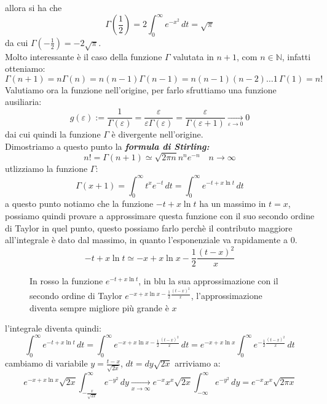 allora  si ha che
\[\Gamma\left(\frac{1}{2}\right) = 2\int_0^\infty e^{-x^2}\,dt = \sqrt{\pi}\]
da cui $\Gamma(-\frac{1}{2}) = -2\sqrt{\pi}$.\\
Molto interessante è il caso della funzione $\Gamma$ valutata in $n+1$, com $n\in\mathbb{N}$, infatti otteniamo:
\[\Gamma(n+1) = n\Gamma(n) = n(n-1)\Gamma(n-1) =n(n-1)(n-2)\dots1\,\Gamma(1) = n! \]
Valutiamo ora la funzione nell'origine, per farlo sfruttiamo una funzione ausiliaria:
\[g(\varepsilon) := \frac{1}{\Gamma(\varepsilon)} = \frac{\varepsilon}{\varepsilon\Gamma(\varepsilon)} =\frac{\varepsilon}{\Gamma(\varepsilon+1)} \xrightarrow[\varepsilon\to 0]{} 0\]
dai cui quindi la funzione $\Gamma$ è divergente nell'origine.\\
\newline Dimostriamo a questo punto la \emph{\textbf{formula di Stirling:}}
\[n! = \Gamma(n+1) \simeq \sqrt{2\pi n}n^n e^{-n}\quad n\to \infty \]
utlizziamo la funzione $\Gamma$:
\[\Gamma(x+1) = \int_0^\infty t^{x}e^{-t}\,dt = \int_0^\infty e^{-t+x\ln t}\,dt\]
a questo punto notiamo che la funzione $-t+x\ln t $ ha un massimo in $t=x$, possiamo quindi provare a approssimare questa funzione con il suo secondo ordine di Taylor in quel punto, questo possiamo farlo perchè il contributo maggiore all'integrale è dato dal massimo, in quanto l'esponenziale va rapidamente a 0.
\[-t+x\ln t \simeq -x + x\ln x - \frac{1}{2}\frac{(t-x)^2}{x}\]
\begin{figure}[H]
\centering
{}
\caption{In rosso la funzione $e^{-t+x\ln t}$, in blu la sua approssimazione con il secondo ordine di Taylor $e^{-x+x\ln x -\frac{1}{2}\frac{(t-x)^2}{x}}$, l'approssimazione diventa sempre migliore più grande è $x$}
\end{figure}
l'integrale diventa quindi:
\[\int_0^\infty e^{-t+x\ln t}\,dt = \int_0^\infty e^{-x+x\ln x -\frac{1}{2}\frac{(t-x)^2}{x}}\,dt = e^{-x+x\ln x}\int_0^\infty e^{-\frac{1}{2}\frac{(t-x)^2}{x}}\,dt \]
cambiamo di variabile $y = \frac{t-x}{\sqrt{2x}}$, $dt = dy\sqrt{2x}$ arriviamo a:
\[e^{-x+x\ln x}\sqrt{2x}\int_{-\frac{x}{\sqrt{2x}}}^\infty e^{-y^2}\, dy \xrightarrow[x\to \infty]{} e^{-x}x^x\sqrt{2x}\int_{-\infty}^\infty e^{-y^2}\, dy = e^{-x}x^x\sqrt{2\pi x}  \]
